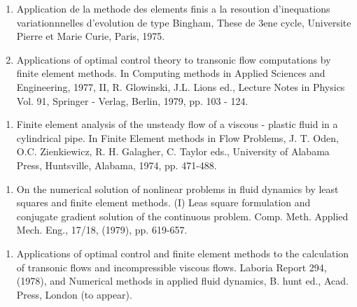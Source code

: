 \begin{thebibliography}{99}

  \begin{enumerate}
  \item  Application de la methode des elements finis a la resoution
 d'inequations variationnnelles d'evolution de type Bingham, These
 de 3ene cycle, Universite Pierre et Marie Curie, Paris, 1975.\label{k21:e1} 

  \item  Applications of optimal control theory to transonic flow
 computations by finite element methods. In Computing methods in
 Applied Sciences and Engineering, 1977, II, R. Glowinski,
 J.L. Lions ed., Lecture Notes in Physics Vol. 91, Springer -
 Verlag, Berlin, 1979, pp. 103 - 124.\label{k21:e2} 
  \end{enumerate}


  \begin{enumerate}
  \item Finite element analysis of the unsteady flow of a viscous -
 plastic fluid in a cylindrical pipe. In Finite Element methods in
 Flow Problems, J. T. Oden, O.C. Zienkiewicz, R. H. Galagher,
 C. Taylor eds., University of Alabama Press, Huntsville, Alabama,
 1974, pp. 471-488.\label{k22:e1} 
  \end{enumerate}


  \begin{enumerate}
  \item  On the numerical solution of nonlinear problems in fluid
 dynamics by least squares and finite element methods. (I) Leas
 square formulation and conjugate gradient solution of the
 continuous problem. Comp. Meth. Applied Mech. Eng., 17/18, (1979),
 pp. 619-657.\label{k23:e1}
  \end{enumerate}


  \begin{enumerate}
  \item Applications of optimal control and finite element methods to
 the calculation of transonic flows and incompressible viscous
 flows. Laboria Report 294, (1978), and Numerical methods in
 applied fluid dynamics, B. hunt ed., Acad. Press, London (to
 appear).\label{k24:e1} 


\end{enumerate}
\end{thebibliography}
